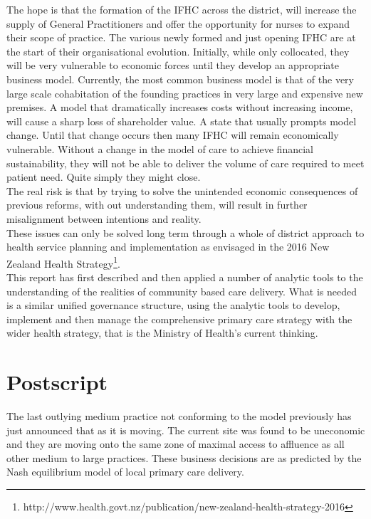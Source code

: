\documentclass[11pt,a4paper]{article}
\begin{document}
The hope is that the formation of the IFHC across the district, will increase the supply of General Practitioners and offer the opportunity for nurses to expand their scope of practice. The various newly formed and just opening IFHC are at the start of their organisational evolution. Initially, while only collocated, they will be very vulnerable to economic forces until they develop an appropriate business model. Currently, the most common business model is that of the very large scale cohabitation of the founding practices in very large and expensive new premises. A model that dramatically increases costs without increasing income, will cause a sharp loss of shareholder value. A state that usually prompts model change. Until that change occurs then many IFHC will remain economically vulnerable. Without a change in the model of care to achieve financial sustainability, they will not be able to deliver the volume of care required to meet patient need. Quite simply they might close.\\

The real risk is that by trying to solve the unintended economic consequences of previous reforms, with out understanding them, will result in further misalignment between intentions and reality\citep{kerr1995folly}.\\

These issues can only be solved long term through a whole of district approach to health service planning and implementation as envisaged in the 2016 New Zealand Health Strategy\footnote{http://www.health.govt.nz/publication/new-zealand-health-strategy-2016}.\\

This report has first described and then applied a number of analytic tools to the understanding of the realities of community based care delivery. What is needed is a similar unified governance structure, using the analytic tools to develop, implement and then manage the  comprehensive primary care strategy with the wider health strategy, that is the Ministry of Health's current thinking.\\

\section{Postscript}
The last outlying medium practice not conforming to the model previously has just announced that as it is moving. The current site was found to be uneconomic and they are moving onto the same zone of maximal access to affluence as all other medium to large practices. These business decisions are as predicted by the Nash equilibrium model of local primary care delivery. \\
\end{document}
